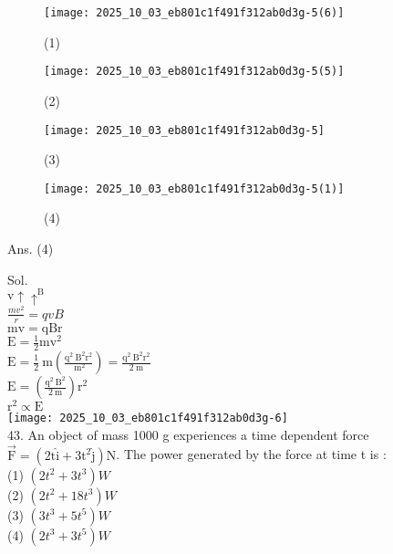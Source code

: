 \documentclass[10pt]{article}
\begin{document}
\begin{figure}[h]
\begin{center}
\captionsetup{labelformat=empty}
\caption{(1)}
  \texttt{[image: 2025\_10\_03\_eb801c1f491f312ab0d3g-5(6)]}
\end{center}
\end{figure}

\begin{figure}[h]
\begin{center}
\captionsetup{labelformat=empty}
\caption{(2)}
  \texttt{[image: 2025\_10\_03\_eb801c1f491f312ab0d3g-5(5)]}
\end{center}
\end{figure}

\begin{figure}[h]
\begin{center}
\captionsetup{labelformat=empty}
\caption{(3)}
  \texttt{[image: 2025\_10\_03\_eb801c1f491f312ab0d3g-5]}
\end{center}
\end{figure}

\begin{figure}[h]
\begin{center}
\captionsetup{labelformat=empty}
\caption{(4)}
  \texttt{[image: 2025\_10\_03\_eb801c1f491f312ab0d3g-5(1)]}
\end{center}
\end{figure}

Ans. (4)

Sol.\\
\(\mathrm{v} \uparrow \uparrow^{\mathrm{B}}\)\\
\(\frac{m v^{2}}{r}=q v B\)\\
\(\mathrm{mv}=\mathrm{qBr}\)\\
\(\mathrm{E}=\frac{1}{2} \mathrm{mv}^{2}\)\\
\(\mathrm{E}=\frac{1}{2} \mathrm{~m}\left(\frac{\mathrm{q}^{2} \mathrm{~B}^{2} \mathrm{r}^{2}}{\mathrm{~m}^{2}}\right)=\frac{\mathrm{q}^{2} \mathrm{~B}^{2} \mathrm{r}^{2}}{2 \mathrm{~m}}\)\\
\(\mathrm{E}=\left(\frac{\mathrm{q}^{2} \mathrm{~B}^{2}}{2 \mathrm{~m}}\right) \mathrm{r}^{2}\)\\
\(\mathrm{r}^{2} \propto \mathrm{E}\)\\
\texttt{[image: 2025\_10\_03\_eb801c1f491f312ab0d3g-6]}\\
43. An object of mass 1000 g experiences a time dependent force \(\overrightarrow{\mathrm{F}}=\left(2 \mathrm{t} \hat{\mathrm{i}}+3 \mathrm{t}^{2} \hat{\mathrm{j}}\right) \mathrm{N}\). The power generated by the force at time t is :\\
(1) \(\left(2 t^{2}+3 t^{3}\right) W\)\\
(2) \(\left(2 t^{2}+18 t^{3}\right) W\)\\
(3) \(\left(3 t^{3}+5 t^{5}\right) W\)\\
(4) \(\left(2 t^{3}+3 t^{5}\right) W\)
\end{document}
